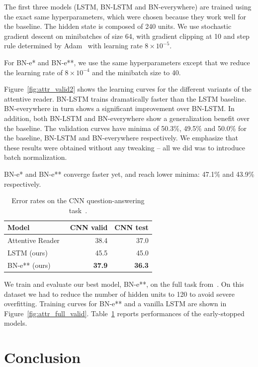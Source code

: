 \documentclass{article} %
\begin{document}
The first three models (LSTM, BN-LSTM and BN-everywhere) are trained using the exact same hyperparameters, which were chosen because they work well for the baseline.
The hidden state is composed of 240 units.
We use stochastic gradient descent on minibatches of size 64,
with gradient clipping at 10 and step rule determined by Adam~\citep{kingma2014adam}
with learning rate $8 \times 10^{-5}$.

For BN-e* and BN-e**, we use the same hyperparameters except that we reduce the learning rate of $8 \times 10^{-4}$ and the minibatch size to 40.

Figure~\ref{fig:attr_valid2} shows the learning curves for the different variants of the attentive reader.
BN-LSTM trains dramatically faster than the LSTM baseline.
BN-everywhere in turn shows a significant improvement over BN-LSTM.
In addition, both BN-LSTM and BN-everywhere show a generalization benefit over the baseline.
The validation curves have minima of 50.3\%, 49.5\% and 50.0\% for the baseline, BN-LSTM and BN-everywhere respectively.
We emphasize that these results were obtained without any tweaking -- all we did was to introduce batch normalization.

BN-e* and BN-e** converge faster yet, and reach lower minima: 47.1\% and 43.9\% respectively.

\begin{table}%
  \center
  \begin{tabular}{@{}lrr@{}}
  \toprule
  \bf Model & \bf CNN valid & \bf CNN test \\
  \midrule
  Attentive Reader~\citep{attentivereader} & 38.4 & 37.0 \\
  \midrule
  LSTM (ours) & 45.5 & 45.0 \\
  BN-e** (ours) & \textbf{37.9} & \textbf{36.3} \\
  \bottomrule
\end{tabular}
\caption{Error rates on the CNN question-answering task~\citet{attentivereader}.}
\label{tab:attr_full}
\end{table}

We train and evaluate our best model, BN-e**, on the full task from~\citep{attentivereader}.
On this dataset we had to reduce the number of hidden units to 120 to avoid severe overfitting.
Training curves for BN-e** and a vanilla LSTM are shown in Figure~\ref{fig:attr_full_valid}.
Table~\ref{tab:attr_full} reports performances of the early-stopped models.

\section{Conclusion}
\end{document}
